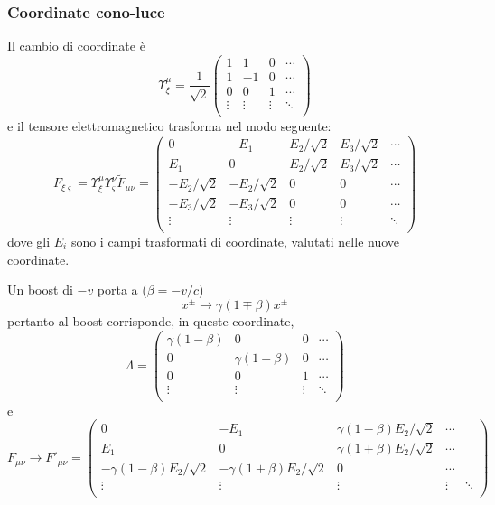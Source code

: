 \subsubsection{Coordinate cono-luce}
Il cambio di coordinate \`e
\[ \Upsilon_\xi^\mu = 
\frac{1}{\sqrt{2}}
\begin{pmatrix}
	1 &  1 & 0 &\cdots  \\
	1 & -1 & 0 & \cdots  \\       
	0 &  0 & 1 & \cdots \\
	\vdots  & \vdots  & \vdots & \ddots \\
\end{pmatrix} 
\]
 e il tensore elettromagnetico trasforma nel modo seguente:
\[ F_{\xi\varsigma} = \Upsilon_\xi^\mu \Upsilon_\varsigma^\nu \tilde{F}_{\mu\nu} = 
\begin{pmatrix} 
	0             &  -E_1         & E_2/\sqrt{2}   & E_3/\sqrt{2} & \cdots \\
	E_1           &  0            & E_2/\sqrt{2}   & E_3/\sqrt{2} & \cdots \\       
	-E_2/\sqrt{2} & -E_2/\sqrt{2} & 0              & 0            & \cdots \\
	-E_3/\sqrt{2} & -E_3/\sqrt{2} & 0              & 0            & \cdots \\
	\vdots        & \vdots        & \vdots         & \vdots       & \ddots \\
\end{pmatrix}
\]
dove gli $E_i$ sono i campi trasformati di coordinate, valutati nelle nuove coordinate. 

Un boost di $-v$ porta a  (\( \beta = -v/c\))
\[ x^{\pm} \rightarrow \gamma(1\mp\beta) x^{\pm} \]
pertanto al boost corrisponde, in queste coordinate, 
\[ \Lambda =
\begin{pmatrix}
	\gamma(1-\beta) & 0               & 0      &\cdots  \\
	0               & \gamma(1+\beta) & 0      & \cdots  \\       
	0               & 0               & 1      & \cdots \\
	\vdots          & \vdots          & \vdots & \ddots \\
\end{pmatrix} 
\]
e
\[ F_{\mu\nu} \rightarrow F'_{\mu\nu} =
\begin{pmatrix} 
	0                             &  -E_1                & \gamma(1-\beta) E_2/\sqrt{2} & \cdots \\
	E_1                           &  0                   & \gamma(1+\beta) E_2/\sqrt{2} & \cdots \\      
	-\gamma(1-\beta)E_2/\sqrt{2}  & -\gamma(1+\beta)E_2/\sqrt{2}       & 0           & \cdots \\
	\vdots        & \vdots        & \vdots        & \vdots                       & \ddots \\
\end{pmatrix}
\]

